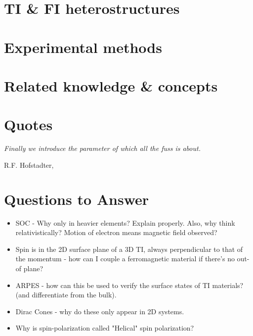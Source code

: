 \documentclass{article} %
\begin{document}
\section{TI \& FI heterostructures}


\section{Experimental methods}


\section{Related knowledge \& concepts}


\section{Quotes}
\epigraph{\textit{Finally we introduce the parameter of which all the fuss is about.}}{R.F. Hofstadter, \textit{\cite{hofstadter_energy_1976}}}

\section{Questions to Answer}
	\begin{itemize}
		\item SOC - Why only in heavier elements? Explain properly. Also, why think relativistically? Motion of electron means magnetic field observed?
		\item Spin is in the 2D surface plane of a 3D TI, always perpendicular to that of the momentum - how can I couple a ferromagnetic material if there's no out-of plane?
		\item ARPES - how can this be used to verify the surface states of TI materials? (and differentiate from the bulk).
		\item Dirac Cones - why do these only appear in 2D systems.
		\item Why is spin-polarization called "Helical" spin polarization?
	\end{itemize}

%

%
\end{document}
